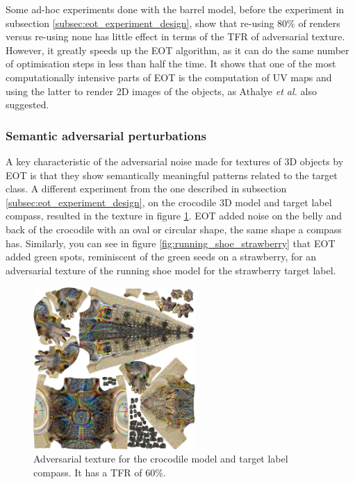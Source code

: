 Some ad-hoc experiments done with the barrel model, before the experiment in subsection \ref{subsec:eot_experiment_design}, show that re-using 80\% of renders versus re-using none has little effect in terms of the TFR of adversarial texture. However, it greatly speeds up the EOT algorithm, as it can do the same number of optimisation steps in less than half the time. It shows that one of the most computationally intensive parts of EOT is the computation of UV maps and using the latter to render 2D images of the objects, as Athalye \textit{et al.} \cite{athalye} also suggested.

\subsubsection{Semantic adversarial perturbations}

A key characteristic of the adversarial noise made for textures of 3D objects by EOT is that they show semantically meaningful patterns related to the target class. A different experiment from the one described in subsection \ref{subsec:eot_experiment_design}, on the crocodile 3D model and target label compass, resulted in the texture in figure \ref{fig:crocodile_compass}. EOT added noise on the belly and back of the crocodile with an oval or circular shape, the same shape a compass has. Similarly, you can see in figure \ref{fig:running_shoe_strawberry} that EOT added green spots, reminiscent of the green seeds on a strawberry, for an adversarial texture of the running shoe model for the strawberry target label.

\begin{figure}[H]
    \centering
    \includegraphics[width=0.55\textwidth]{graphics/crocodile compass.jpg}
    \caption[Adversarial texture for the crocodile model and target label compass.]{Adversarial texture for the crocodile model and target label compass. It has a TFR of 60\%.}
    \label{fig:crocodile_compass}
\end{figure}

